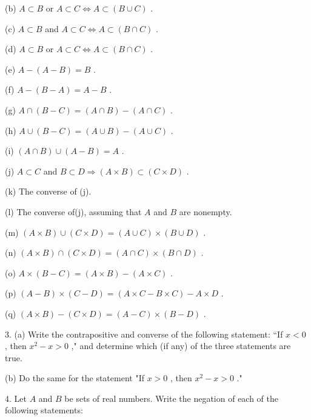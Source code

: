 (b) \(A \subset  B\) or \(A \subset  C \Leftrightarrow  A \subset  \left( {B \cup  C}\right)\) .

(c) \(A \subset  B\) and \(A \subset  C \Leftrightarrow  A \subset  \left( {B \cap  C}\right)\) .

(d) \(A \subset  B\) or \(A \subset  C \Leftrightarrow  A \subset  \left( {B \cap  C}\right)\) .

(e) \(A - \left( {A - B}\right)  = B\) .

(f) \(A - \left( {B - A}\right)  = A - B\) .

(g) \(A \cap  \left( {B - C}\right)  = \left( {A \cap  B}\right)  - \left( {A \cap  C}\right)\) .

(h) \(A \cup  \left( {B - C}\right)  = \left( {A \cup  B}\right)  - \left( {A \cup  C}\right)\) .

(i) \(\left( {A \cap  B}\right)  \cup  \left( {A - B}\right)  = A\) .

(j) \(A \subset  C\) and \(B \subset  D \Rightarrow  \left( {A \times  B}\right)  \subset  \left( {C \times  D}\right)\) .

(k) The converse of (j).

(l) The converse of(j), assuming that \(A\) and \(B\) are nonempty.

(m) \(\left( {A \times  B}\right)  \cup  \left( {C \times  D}\right)  = \left( {A \cup  C}\right)  \times  \left( {B \cup  D}\right)\) .

(n) \(\left( {A \times  B}\right)  \cap  \left( {C \times  D}\right)  = \left( {A \cap  C}\right)  \times  \left( {B \cap  D}\right)\) .

(o) \(A \times  \left( {B - C}\right)  = \left( {A \times  B}\right)  - \left( {A \times  C}\right)\) .

(p) \(\left( {A - B}\right)  \times  \left( {C - D}\right)  = \left( {A \times  C - B \times  C}\right)  - A \times  D\) .

(q) \(\left( {A \times  B}\right)  - \left( {C \times  D}\right)  = \left( {A - C}\right)  \times  \left( {B - D}\right)\) .

3. (a) Write the contrapositive and converse of the following statement: “If \(x < 0\) , then \({x}^{2} - x > 0\) ," and determine which (if any) of the three statements are true.

(b) Do the same for the statement "If \(x > 0\) , then \({x}^{2} - x > 0\) ."

4. Let \(A\) and \(B\) be sets of real numbers. Write the negation of each of the following statements:

